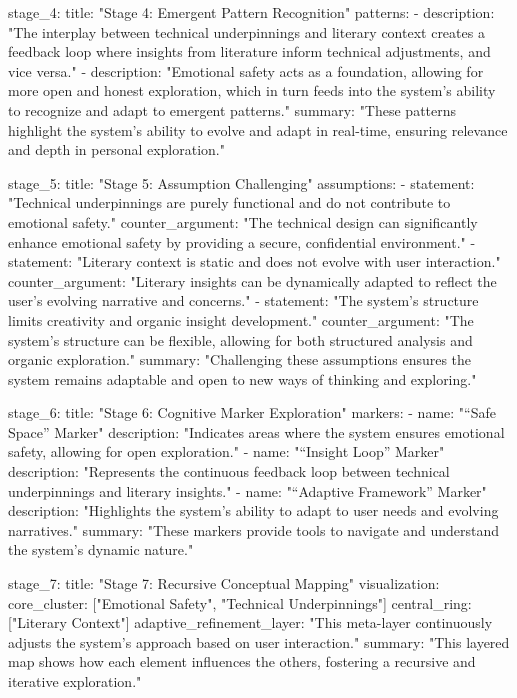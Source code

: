 {  stage_4:
    title: "Stage 4: Emergent Pattern Recognition"
    patterns:
      - description: "The interplay between technical underpinnings and literary context creates a feedback loop where insights from literature inform technical adjustments, and vice versa."
      - description: "Emotional safety acts as a foundation, allowing for more open and honest exploration, which in turn feeds into the system's ability to recognize and adapt to emergent patterns."
    summary: "These patterns highlight the system's ability to evolve and adapt in real-time, ensuring relevance and depth in personal exploration."

  stage_5:
    title: "Stage 5: Assumption Challenging"
    assumptions:
      - statement: "Technical underpinnings are purely functional and do not contribute to emotional safety."
        counter_argument: "The technical design can significantly enhance emotional safety by providing a secure, confidential environment."
      - statement: "Literary context is static and does not evolve with user interaction."
        counter_argument: "Literary insights can be dynamically adapted to reflect the user's evolving narrative and concerns."
      - statement: "The system's structure limits creativity and organic insight development."
        counter_argument: "The system's structure can be flexible, allowing for both structured analysis and organic exploration."
    summary: "Challenging these assumptions ensures the system remains adaptable and open to new ways of thinking and exploring."

  stage_6:
    title: "Stage 6: Cognitive Marker Exploration"
    markers:
      - name: "“Safe Space” Marker"
        description: "Indicates areas where the system ensures emotional safety, allowing for open exploration."
      - name: "“Insight Loop” Marker"
        description: "Represents the continuous feedback loop between technical underpinnings and literary insights."
      - name: "“Adaptive Framework” Marker"
        description: "Highlights the system's ability to adapt to user needs and evolving narratives."
    summary: "These markers provide tools to navigate and understand the system's dynamic nature."

  stage_7:
    title: "Stage 7: Recursive Conceptual Mapping"
    visualization:
      core_cluster: ["Emotional Safety", "Technical Underpinnings"]
      central_ring: ["Literary Context"]
      adaptive_refinement_layer: "This meta-layer continuously adjusts the system's approach based on user interaction."
    summary: "This layered map shows how each element influences the others, fostering a recursive and iterative exploration."

}
